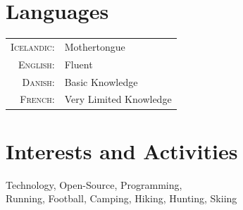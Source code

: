 \documentclass[a4paper,10pt]{article}
\begin{document}
\section{Languages}
\begin{tabular}{rl}
 \textsc{Icelandic:}&Mothertongue\\
\textsc{English:}&Fluent\\
\textsc{Danish:}&Basic Knowledge\\
\textsc{French:}&Very Limited Knowledge\\
\end{tabular}

\section{Interests and Activities}
Technology, Open-Source, Programming,\\
Running, Football, Camping, Hiking, Hunting, Skiing
\end{document}
